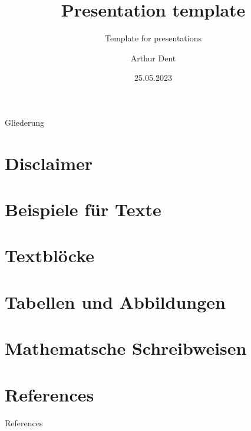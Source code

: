 \documentclass[aspectratio=43,10pt]{beamer}
\title[HAW Hamburg Projector]{Presentation template}
\subtitle{Template for presentations}
\author{Arthur Dent}
\institute{Hochschule für Angewandte Wissenschaften Hamburg}
\date{25.05.2023}
\begin{document}
\maketitle



\begin{frame}{Gliederung}
  \tableofcontents
\end{frame}


\section{Disclaimer}



\section{Beispiele für Texte}



\section{Textblöcke}


\section{Tabellen und Abbildungen}



\section{Mathematsche Schreibweisen}



\section{References}



\begin{frame}[allowframebreaks]{References}
  \printbibliography
\end{frame}
\end{document}
